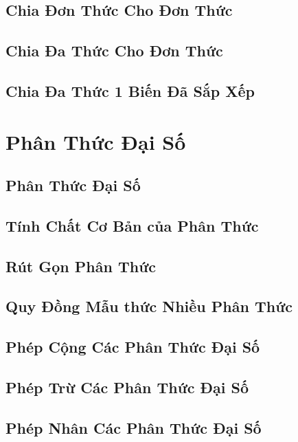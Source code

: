 \documentclass[oneside]{book}
\numberwithin{equation}{section}
\begin{document}
\section{Chia Đơn Thức Cho Đơn Thức}

\section{Chia Đa Thức Cho Đơn Thức}

\section{Chia Đa Thức 1 Biến Đã Sắp Xếp}


\chapter{Phân Thức Đại Số}

\section{Phân Thức Đại Số}

\section{Tính Chất Cơ Bản của Phân Thức}

\section{Rút Gọn Phân Thức}

\section{Quy Đồng Mẫu thức Nhiều Phân Thức}

\section{Phép Cộng Các Phân Thức Đại Số}

\section{Phép Trừ Các Phân Thức Đại Số}

\section{Phép Nhân Các Phân Thức Đại Số}
\end{document}
